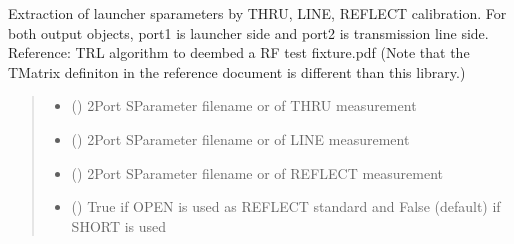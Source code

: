 \documentclass[letterpaper,10pt,english]{sphinxmanual}
\begin{document}

\begin{fulllineitems}
\label{\detokenize{touchstone:touchstone.trl_launcher_extraction}}
\pysigstartsignatures
{}
\pysigstopsignatures
\sphinxAtStartPar
Extraction of launcher s\sphinxhyphen{}parameters by THRU, LINE, REFLECT calibration. For both output  objects, port\sphinxhyphen{}1 is launcher side and port\sphinxhyphen{}2 is transmission line side.
Reference: TRL algorithm to de\sphinxhyphen{}embed a RF test fixture.pdf (Note that the T\sphinxhyphen{}Matrix definiton in the reference document is different than this library.)
\begin{quote}\begin{description}
\begin{itemize}
\item {}
\sphinxAtStartPar
{} () \textendash{} 2\sphinxhyphen{}Port S\sphinxhyphen{}Parameter filename or  of THRU measurement

\item {}
\sphinxAtStartPar
{} () \textendash{} 2\sphinxhyphen{}Port S\sphinxhyphen{}Parameter filename or  of LINE measurement

\item {}
\sphinxAtStartPar
{} () \textendash{} 2\sphinxhyphen{}Port S\sphinxhyphen{}Parameter filename or  of REFLECT measurement

\item {}
\sphinxAtStartPar
{} () \textendash{} True if OPEN is used as REFLECT standard and False (default) if SHORT is used

\end{itemize}


\end{description}
\end{quote}
\end{fulllineitems}
\end{document}
